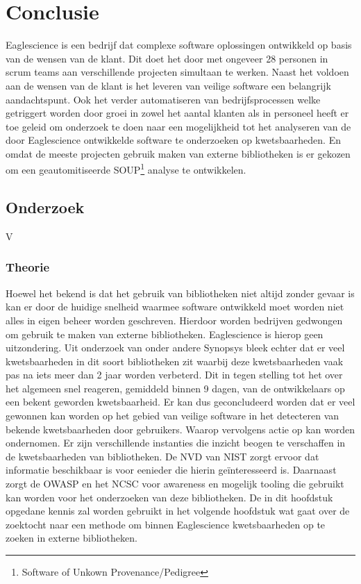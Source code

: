
\chapter{Conclusie}\label{ch:conclusie} %
Eaglescience is een bedrijf dat complexe software oplossingen ontwikkeld op basis van de wensen van de klant. Dit doet het door met ongeveer 28 personen in scrum teams aan verschillende projecten simultaan te werken. Naast het voldoen aan de wensen van de klant is het leveren van veilige software een belangrijk aandachtspunt. Ook het verder automatiseren van bedrijfsprocessen welke getriggert worden door groei in zowel het aantal klanten als in personeel heeft er toe geleid om onderzoek te doen naar een mogelijkheid tot het analyseren van de door Eaglescience ontwikkelde software te onderzoeken op kwetsbaarheden. En omdat de meeste projecten gebruik maken van externe bibliotheken is er gekozen om een geautomitiseerde SOUP\footnote{Software of Unkown Provenance/Pedigree} analyse te ontwikkelen.




\section{Onderzoek}\label{sec:onderzoek}
V
\subsection{Theorie}\label{subsec:theorie}
Hoewel het bekend is dat het gebruik van bibliotheken niet altijd zonder gevaar is kan er door de huidige snelheid waarmee software ontwikkeld moet worden niet alles in eigen beheer worden geschreven. Hierdoor worden bedrijven gedwongen om gebruik te maken van externe bibliotheken. Eaglescience is hierop geen uitzondering. Uit onderzoek van onder andere Synopsys bleek echter dat er veel kwetsbaarheden in dit soort bibliotheken zit waarbij deze kwetsbaarheden vaak pas na iets meer dan 2 jaar worden verbeterd. Dit in tegen stelling tot het over het algemeen snel reageren, gemiddeld binnen 9 dagen, van de ontwikkelaars op een bekent geworden kwetsbaarheid. Er kan dus geconcludeerd worden dat er veel gewonnen kan worden op het gebied van veilige software in het detecteren van bekende kwetsbaarheden door gebruikers. Waarop vervolgens actie op kan worden ondernomen. Er zijn verschillende instanties die inzicht beogen te verschaffen in de kwetsbaarheden van bibliotheken. De NVD van NIST zorgt ervoor dat informatie beschikbaar is voor eenieder die hierin geïnteresseerd is. Daarnaast zorgt de OWASP  en het NCSC voor awareness en mogelijk tooling die gebruikt kan worden voor het onderzoeken van deze bibliotheken. De in dit hoofdstuk opgedane kennis zal worden gebruikt in het volgende hoofdstuk wat gaat over de zoektocht naar een methode om binnen Eaglescience kwetsbaarheden op te zoeken in externe bibliotheken.


